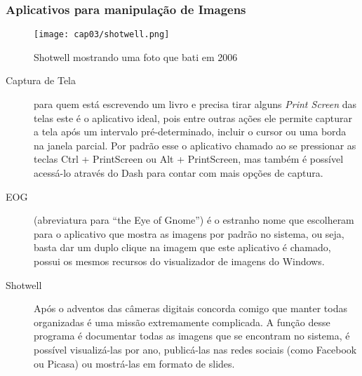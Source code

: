 \subsubsection{Aplicativos para manipulação de Imagens}
\begin{figure}[h!]
\centering\texttt{[image: cap03/shotwell.png]}
\caption{Shotwell mostrando uma foto que bati em 2006}
\end{figure}
\begin{description}
 \item[Captura de Tela] para quem está escrevendo um livro e precisa tirar alguns \textit{Print Screen} das telas este é o aplicativo ideal, pois entre outras ações ele permite capturar a tela após um intervalo pré-determinado, incluir o cursor ou uma borda na janela parcial. Por padrão esse o aplicativo chamado ao se pressionar as teclas Ctrl + PrintScreen ou Alt + PrintScreen, mas também é possível acessá-lo através do Dash para contar com mais opções de captura.
 \item[EOG] (abreviatura para ``the Eye of Gnome'') é o estranho nome que escolheram para o aplicativo que mostra as imagens por padrão no sistema, ou seja, basta dar um duplo clique na imagem que este aplicativo é chamado, possui os mesmos recursos do visualizador de imagens do Windows.
 \item[Shotwell] Após o adventos das câmeras digitais concorda comigo que manter todas organizadas é uma missão extremamente complicada. A função desse programa é documentar todas as imagens que se encontram no sistema, é possível visualizá-las por ano, publicá-las nas redes sociais (como Facebook ou Picasa) ou mostrá-las em formato de slides.
\end{description}

